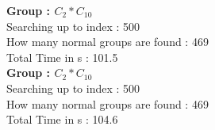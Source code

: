 \textbf{Group : $C_2*C_{10}$}\\
Searching up to index : 500\\
How many normal groups are found : 469\\
Total Time in s : 101.5\\
\textbf{Group : $C_2*C_{10}$}\\
Searching up to index : 500\\
How many normal groups are found : 469\\
Total Time in s : 104.6\\

